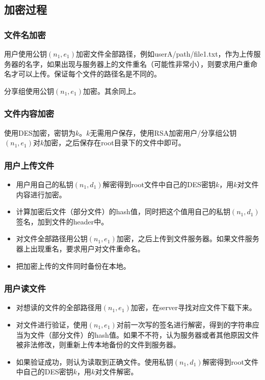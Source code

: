 \documentclass[11pt, oneside]{ctexart}
\begin{document}
\subsection{加密过程}
\subsubsection{文件名加密}
用户使用公钥$(n_1, e_1)$加密文件全部路径，例如userA/path/file1.txt，作为上传服务器的名字，如果出现与服务器上的文件重名（可能性非常小），则要求用户重命名才可以上传。保证每个文件的路径名是不同的。

分享组使用公钥$(n_1, e_1)$加密。其余同上。

\subsubsection{文件内容加密}
使用DES加密，密钥为$k$。$k$无需用户保存，使用RSA加密用户/分享组公钥$(n_1, e_1)$对$k$加密，之后保存在root目录下的文件中即可。

\subsubsection{用户上传文件}\label{sec:user-upload}
\begin{itemize}
\item 用户用自己的私钥$(n_1, d_1)$解密得到root文件中自己的DES密钥$k$，用$k$对文件内容进行加密。
\item 计算加密后文件（部分文件）的hash值，同时把这个值用自己的私钥$(n_1, d_1)$签名，加到文件的header中。
\item 对文件全部路径用公钥$(n_1, e_1)$加密，之后上传到文件服务器。如果文件服务器上出现重名，要求用户对文件重命名。
\item 把加密上传的文件同时备份在本地。
\end{itemize}

\subsubsection{用户读文件}\label{sec:user-read}
\begin{itemize}
\item 对想读的文件的全部路径用$(n_1, e_1)$加密，在server寻找对应文件下载下来。
\item 对文件进行验证，使用$(n_1, e_1)$对前一次写的签名进行解密，得到的字符串应当为文件（部分文件）的hash值。如果不不符，认为服务器或者其他原因文件被非法修改，则重新上传本地备份的文件到服务器。
\item 如果验证成功，则认为读取到正确文件。使用私钥$(n_1, d_1)$解密得到root文件中自己的DES密钥$k$，用$k$对文件解密。
\end{itemize}
\end{document}
